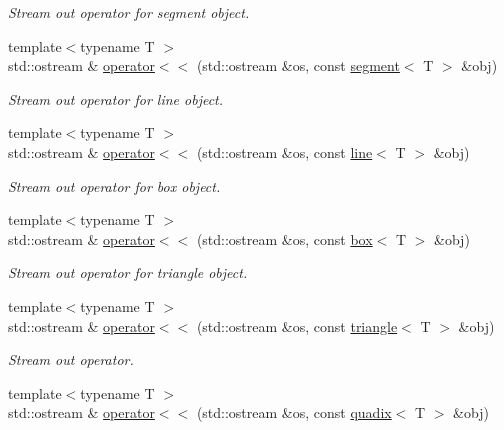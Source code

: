 \begin{DoxyCompactItemize}
\begin{DoxyCompactList}\small\item\em Stream out operator for segment object. \end{DoxyCompactList}\item 
{\footnotesize template$<$typename T $>$ }\\std\+::ostream \& \hyperlink{namespaceddd_a59e2fa950fd945aa8b3dd550720ad3f5}{operator$<$$<$} (std\+::ostream \&os, const \hyperlink{classddd_1_1segment}{segment}$<$ T $>$ \&obj)
\begin{DoxyCompactList}\small\item\em Stream out operator for line object. \end{DoxyCompactList}\item 
{\footnotesize template$<$typename T $>$ }\\std\+::ostream \& \hyperlink{namespaceddd_a2001eec5d960802592e1ca6a5b0dc203}{operator$<$$<$} (std\+::ostream \&os, const \hyperlink{classddd_1_1line}{line}$<$ T $>$ \&obj)
\begin{DoxyCompactList}\small\item\em Stream out operator for box object. \end{DoxyCompactList}\item 
{\footnotesize template$<$typename T $>$ }\\std\+::ostream \& \hyperlink{namespaceddd_af710b0f11be50190553c743ce86545a3}{operator$<$$<$} (std\+::ostream \&os, const \hyperlink{classddd_1_1box}{box}$<$ T $>$ \&obj)
\begin{DoxyCompactList}\small\item\em Stream out operator for triangle object. \end{DoxyCompactList}\item 
{\footnotesize template$<$typename T $>$ }\\std\+::ostream \& \hyperlink{namespaceddd_a3a6f828f85e4fa306f0d950f1aab4f64}{operator$<$$<$} (std\+::ostream \&os, const \hyperlink{classddd_1_1triangle}{triangle}$<$ T $>$ \&obj)
\begin{DoxyCompactList}\small\item\em Stream out operator. \end{DoxyCompactList}\item 
{\footnotesize template$<$typename T $>$ }\\std\+::ostream \& \hyperlink{namespaceddd_a58ae88cefdf3b919e400db6de59f4cfc}{operator$<$$<$} (std\+::ostream \&os, const \hyperlink{classddd_1_1quadix}{quadix}$<$ T $>$ \&obj)

\end{DoxyCompactItemize}
